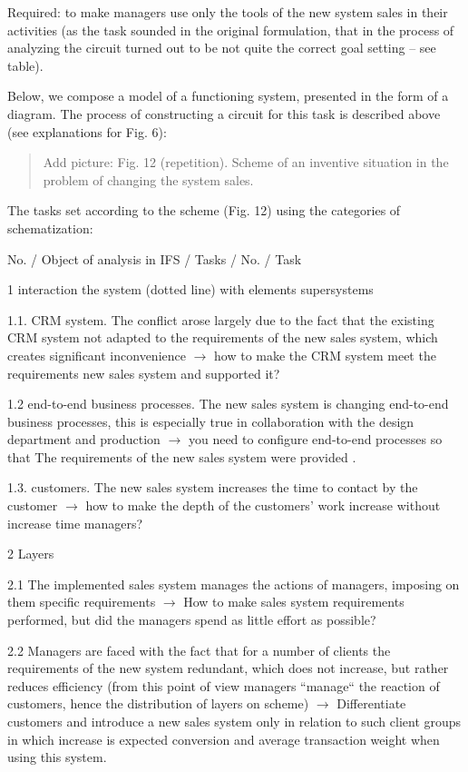 \documentclass[11pt,a4paper]{book}
\newcommand{\addpicture}[1]{
  \begin{quote} Add picture: #1\end{quote}
}
\begin{document}
Required: to make managers use only the tools of the new system sales in their
activities (as the task sounded in the original formulation, that in the
process of analyzing the circuit turned out to be not quite the correct goal
setting -- see table).

Below, we compose a model of a functioning system, presented in the form of a
diagram.  The process of constructing a circuit for this task is described
above (see explanations for Fig. 6):

\addpicture{Fig. 12 (repetition). Scheme of an inventive situation in the
  problem of changing the system sales.}

The tasks set according to the scheme (Fig. 12) using the categories of
schematization:


No. / Object of analysis in IFS / Tasks / No. / Task

1 interaction the system (dotted line) with elements supersystems

1.1.  CRM system. The conflict arose largely due to the fact that the existing
CRM system not adapted to the requirements of the new sales system, which
creates significant inconvenience $\to$ how to make the CRM system meet the
requirements new sales system and supported it?

1.2 end-to-end business processes. The new sales system is changing end-to-end
business processes, this is especially true in collaboration with the design
department and production $\to$ you need to configure end-to-end processes so
that The requirements of the new sales system were provided .

1.3.  customers. The new sales system increases the time to contact by the
customer $\to$ how to make the depth of the customers' work increase without
increase time managers?

2 Layers

2.1 The implemented sales system manages the actions of managers, imposing on
them specific requirements $\to$ How to make sales system requirements
performed, but did the managers spend as little effort as possible?

2.2 Managers are faced with the fact that for a number of clients the
requirements of the new system redundant, which does not increase, but rather
reduces efficiency (from this point of view managers “manage“ the reaction of
customers, hence the distribution of layers on scheme) $\to$ Differentiate
customers and introduce a new sales system only in relation to such client
groups in which increase is expected conversion and average transaction weight
when using this system.
\end{document}
